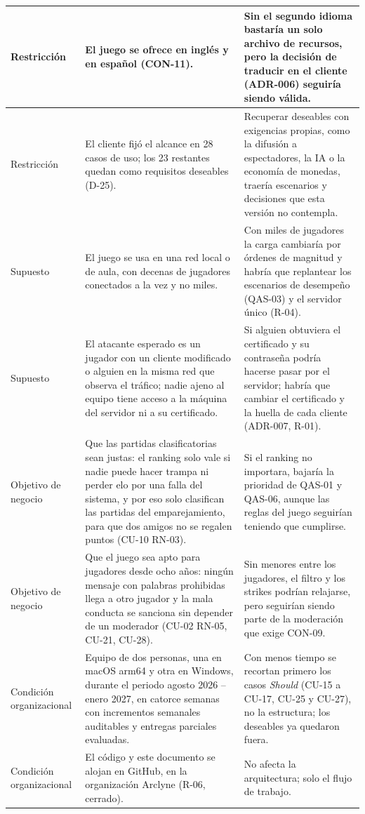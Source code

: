 \documentclass[11pt,letterpaper]{article}
\begin{document}
\begin{xltabular}{\linewidth}{|p{3.6cm}|Y|Y|}
  \small Restricción & El juego se ofrece en inglés y en español (CON-11). & Sin el segundo idioma bastaría un solo archivo de recursos, pero la decisión de traducir en el cliente (ADR-006) seguiría siendo válida.\\\hline
  \small Restricción & El cliente fijó el alcance en 28 casos de uso; los 23 restantes quedan como requisitos deseables (D-25). & Recuperar deseables con exigencias propias, como la difusión a espectadores, la IA o la economía de monedas, traería escenarios y decisiones que esta versión no contempla.\\\hline
  \small Supuesto & El juego se usa en una red local o de aula, con decenas de jugadores conectados a la vez y no miles. & Con miles de jugadores la carga cambiaría por órdenes de magnitud y habría que replantear los escenarios de desempeño (QAS-03) y el servidor único (R-04).\\\hline
  \small Supuesto & El atacante esperado es un jugador con un cliente modificado o alguien en la misma red que observa el tráfico; nadie ajeno al equipo tiene acceso a la máquina del servidor ni a su certificado. & Si alguien obtuviera el certificado y su contraseña podría hacerse pasar por el servidor; habría que cambiar el certificado y la huella de cada cliente (ADR-007, R-01).\\\hline
  \small Objetivo de negocio & Que las partidas clasificatorias sean justas: el ranking solo vale si nadie puede hacer trampa ni perder elo por una falla del sistema, y por eso solo clasifican las partidas del emparejamiento, para que dos amigos no se regalen puntos (CU-10 RN-03). & Si el ranking no importara, bajaría la prioridad de QAS-01 y QAS-06, aunque las reglas del juego seguirían teniendo que cumplirse.\\\hline
  \small Objetivo de negocio & Que el juego sea apto para jugadores desde ocho años: ningún mensaje con palabras prohibidas llega a otro jugador y la mala conducta se sanciona sin depender de un moderador (CU-02 RN-05, CU-21, CU-28). & Sin menores entre los jugadores, el filtro y los strikes podrían relajarse, pero seguirían siendo parte de la moderación que exige CON-09.\\\hline
  \small Condición organizacional & Equipo de dos personas, una en macOS arm64 y otra en Windows, durante el periodo agosto 2026 – enero 2027, en catorce semanas con incrementos semanales auditables y entregas parciales evaluadas. & Con menos tiempo se recortan primero los casos \textit{Should} (CU-15 a CU-17, CU-25 y CU-27), no la estructura; los deseables ya quedaron fuera.\\\hline
  \small Condición organizacional & El código y este documento se alojan en GitHub, en la organización Arclyne (R-06, cerrado). & No afecta la arquitectura; solo el flujo de trabajo.\\\hline
\end{xltabular}
\end{document}
